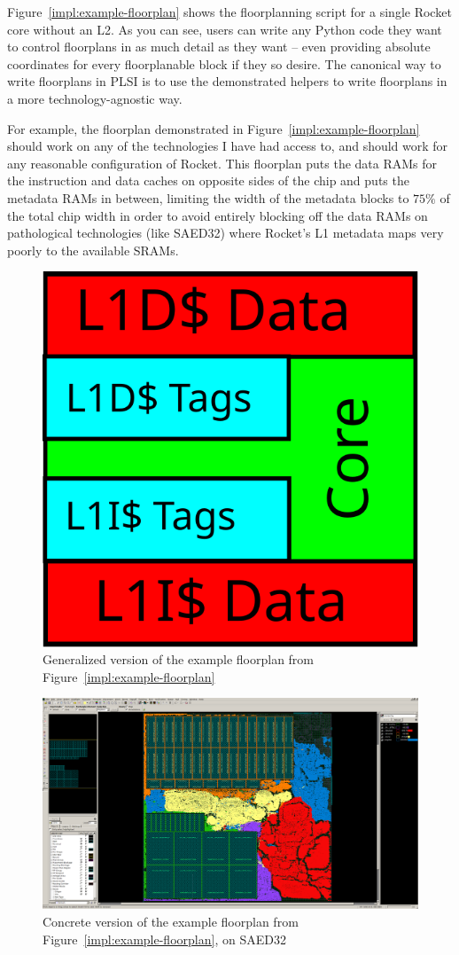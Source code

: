 \documentclass{article}
\begin{document}
Figure~\ref{impl:example-floorplan} shows the floorplanning script for a single
Rocket core without an L2.  As you can see, users can write any Python code
they want to control floorplans in as much detail as they want -- even
providing absolute coordinates for every floorplanable block if they so desire.
The canonical way to write floorplans in PLSI is to use the demonstrated
helpers to write floorplans in a more technology-agnostic way.

For example, the floorplan demonstrated in Figure~\ref{impl:example-floorplan}
should work on any of the technologies I have had access to, and should work
for any reasonable configuration of Rocket.  This floorplan puts the data RAMs
for the instruction and data caches on opposite sides of the chip and puts the
metadata RAMs in between, limiting the width of the metadata blocks to $75\%$
of the total chip width in order to avoid entirely blocking off the data RAMs
on pathological technologies (like SAED32) where Rocket's L1 metadata maps very
poorly to the available SRAMs.

\begin{figure}
  \begin{center}
    \includegraphics[width=0.333\linewidth]{figures/rocket-floorplan-general.svg}
  \end{center}
  \caption{Generalized version of the example floorplan from Figure~\ref{impl:example-floorplan}}
  \label{impl:example-floorplan-output}
\end{figure}

\begin{figure}
  \begin{center}
    \includegraphics[width=0.95\linewidth]{figures/icc-rocket.png}
  \end{center}
  \caption{Concrete version of the example floorplan from Figure~\ref{impl:example-floorplan}, on SAED32}
  \label{impl:example-floorplan-saed32}
\end{figure}
\end{document}
